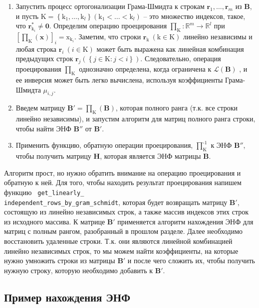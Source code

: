 \begin{enumerate}
\item Запустить процесс ортогонализации Грама-Шмидта к строкам $ \mathbf{r}_1, \ldots, \mathbf{r}_m $ из $ \mathbf{B} $, и пусть $ \mathrm{K}=\left\{\mathrm{k}_1, \ldots, \mathrm{k}_l \right\}(\mathrm{k}_1< \ldots <\mathrm{k}_l) $ – это множество индексов, такое, что $ \mathbf{r}_{\mathrm{k}_i}^\ast \neq \mathbf{0} $. Определим операцию проецирования $ \prod_\mathrm{K}:\mathbb{R}^m \rightarrow \mathbb{R}^l $ при $ [\prod_\mathrm{K}(\mathbf{x})]_i = \mathrm{x}_{\mathrm{k}_i} $. Заметим, что строки $ \mathbf{r}_\mathrm{k}\ (\mathrm{k} \in \mathrm{K}) $ линейно независимы и любая строка $ \mathbf{r}_i\ (i \in \mathrm{K}) $ может быть выражена как линейная комбинация предыдущих строк $ \mathbf{r}_j\left(\left\{j \in \mathrm{K}:j<i \right\}\right) $. Следовательно, операция проецирования $ \prod_\mathrm{K} $ однозначно определена, когда ограничена к $ \mathcal{L}(\mathbf{B})$ , и ее инверсия может быть легко вычислена, используя коэффициенты Грама-Шмидта $ \mu_{i,j} $.
\item Введем матрицу $ \mathbf{B}'=\prod_\mathrm{K}(\mathbf{B}) $, которая полного ранга (т.к. все строки линейно независимы), и запустим алгоритм для матриц полного ранга строки, чтобы найти ЭНФ $ \mathbf{B}'' $ от $ \mathbf{B}' $.
\item Применить функцию, обратную операции проецирования, $ \prod_\mathrm{K}^{\text{-}1} $ к ЭНФ $ \mathbf{B}'' $, чтобы получить матрицу $ \mathbf{H} $, которая является ЭНФ матрицы $ \mathbf{B} $.
\end{enumerate}

Алгоритм прост, но нужно обратить внимание на операцию проецирования и обратную к ней. Для того, чтобы находить результат проецирования напишем функцию \verb! get_linearly_! \\ \verb!independent_rows_by_gram_schmidt!, которая будет возвращать матрицу $ \mathbf{B}' $, состоящую из линейно независимых строк, а также массив индексов этих строк из исходного массива. К матрице $ \mathbf{B}' $ применяется алгоритм нахождения ЭНФ для матриц с полным рангом, разобранный в прошлом разделе. Далее необходимо восстановить удаленные строки. Т.к. они являются линейной комбинацией линейно независимых строк, то мы можем найти коэффициенты, на которые нужно умножить строки из матрицы $ \mathbf{B}' $ и после чего сложить их, чтобы получить нужную строку, которую необходимо добавить к $ \mathbf{B}' $.

\subsection{Пример нахождения ЭНФ}


